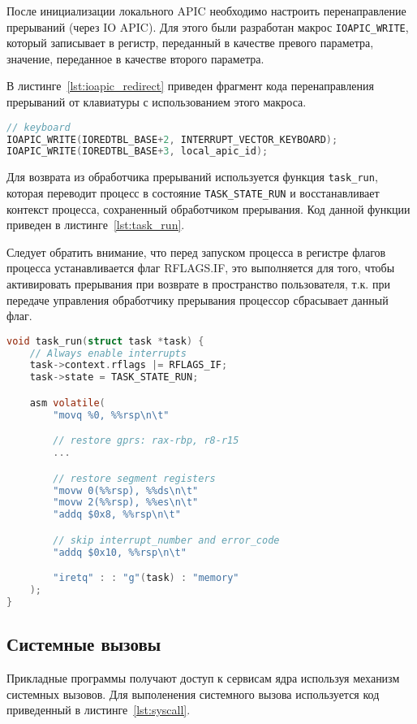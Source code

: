 После инициализации локального APIC необходимо настроить перенаправление прерываний (через IO APIC).
Для этого были разработан макрос \texttt{IOAPIC\_WRITE}, который записывает в регистр, переданный
в качестве превого параметра, значение, переданное в качестве второго параметра.

В листинге~\ref{lst:ioapic_redirect} приведен фрагмент кода перенаправления прерываний от клавиатуры
с использованием этого макроса.

\begin{lstlisting}[language=C,
caption={Настройка IOAPIC},
label={lst:ioapic_redirect}]
// keyboard
IOAPIC_WRITE(IOREDTBL_BASE+2, INTERRUPT_VECTOR_KEYBOARD);
IOAPIC_WRITE(IOREDTBL_BASE+3, local_apic_id);
\end{lstlisting}

Для возврата из обработчика прерываний используется функция \texttt{task\_run},
которая переводит процесс в состояние \texttt{TASK\_STATE\_RUN} и восстанавливает
контекст процесса, сохраненный обработчиком прерывания. Код данной функции
приведен в листинге~\ref{lst:task_run}.

Следует обратить внимание, что перед запуском процесса в регистре флагов процесса
устанавливается флаг RFLAGS.IF, это выполняется для того, чтобы активировать прерывания
при возврате в пространство пользователя, т.к. при передаче управления обработчику
прерывания процессор сбрасывает данный флаг.

\begin{lstlisting}[language=C,
caption={Запуск процесса},
label={lst:task_run}]
void task_run(struct task *task) {
	// Always enable interrupts
	task->context.rflags |= RFLAGS_IF;
	task->state = TASK_STATE_RUN;

	asm volatile(
		"movq %0, %%rsp\n\t"

		// restore gprs: rax-rbp, r8-r15
		...

		// restore segment registers
		"movw 0(%%rsp), %%ds\n\t"
		"movw 2(%%rsp), %%es\n\t"
		"addq $0x8, %%rsp\n\t"

		// skip interrupt_number and error_code
		"addq $0x10, %%rsp\n\t"

		"iretq" : : "g"(task) : "memory"
	);
}
\end{lstlisting}

\subsection{Системные вызовы}
Прикладные программы получают доступ к сервисам ядра используя механизм системных
вызовов. Для выполенения системного вызова используется код приведенный в
листинге~\ref{lst:syscall}.

